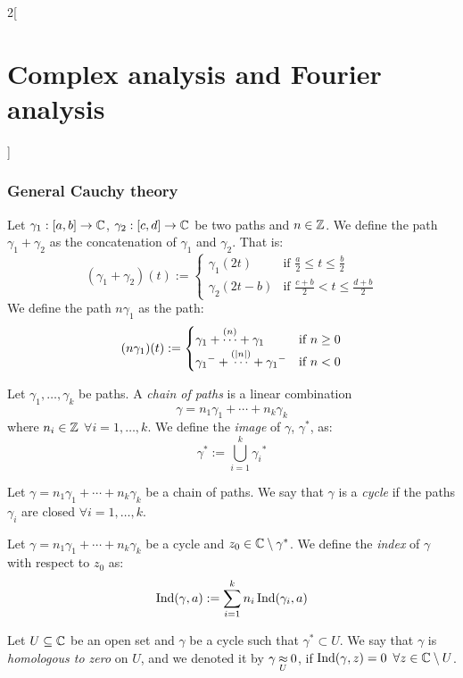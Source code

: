 \documentclass[../../../main.tex]{subfiles}
\begin{document}
\begin{multicols}{2}[\section{Complex analysis and Fourier analysis}]
  \subsubsection{General Cauchy theory}
  \begin{definition}
    Let $\gamma_1:[a,b]\rightarrow\mathbb{C}$, $\gamma_2:[c,d]\rightarrow\mathbb{C}$ be two paths and $n\in\mathbb{Z}$. We define the path $\gamma_1+\gamma_2$ as the concatenation of $\gamma_1$ and $\gamma_2$. That is:
    $$
      (\gamma_1+\gamma_2)(t):=
      \begin{cases}
        \gamma_1(2t)   & \text{if }\frac{a}{2}\leq t\leq \frac{b}{2}  \\
        \gamma_2(2t-b) & \text{if }\frac{c+b}{2} <t\leq \frac{d+b}{2}
      \end{cases}
    $$
    We define the path $n\gamma_1$ as the path:
    $$
      (n\gamma_1)(t):=
      \begin{cases}
        \gamma_1+\overset{(n)}{\cdots}+\gamma_1               & \text{if }n\geq 0 \\
        {\gamma_1}^-+\overset{(\abs{n})}{\cdots}+{\gamma_1}^- & \text{if }n<0
      \end{cases}
    $$
  \end{definition}
  \begin{definition}
    Let $\gamma_1,\ldots,\gamma_k$ be paths. A \emph{chain of paths} is a linear combination $$\gamma=n_1\gamma_1+\cdots+n_k\gamma_k$$ where $n_i\in\mathbb{Z}$ $\forall i=1,\ldots,k$. We define the \emph{image} of $\gamma$, $\gamma^*$, as:
    $$\gamma^*:=\bigcup_{i=1}^k{\gamma_i}^*$$
  \end{definition}
  \begin{definition}
    Let $\gamma=n_1\gamma_1+\cdots+n_k\gamma_k$ be a chain of paths. We say that $\gamma$ is a \emph{cycle} if the paths $\gamma_i$ are closed $\forall i=1,\ldots,k$.
  \end{definition}
  \begin{definition}
    Let $\gamma=n_1\gamma_1+\cdots+n_k\gamma_k$ be a cycle and $z_0\in\mathbb{C}\setminus\gamma^*$. We define the \emph{index} of $\gamma$ with respect to $z_0$ as: $$\operatorname{Ind}(\gamma,a):=\sum_{i=1}^kn_i\operatorname{Ind}(\gamma_i,a)$$
  \end{definition}
  \begin{definition}
    Let $U\subseteq \mathbb{C}$ be an open set and $\gamma$ be a cycle such that $\gamma^*\subset U$. We say that $\gamma$ is \emph{homologous to zero} on $U$, and we denoted it by $\gamma\mathbin{\underset{U}{\approx}} 0$, if $\operatorname{Ind}(\gamma,z)=0$ $\forall z\in\mathbb{C}\setminus U$.
  \end{definition}

\end{multicols}
\end{document}
